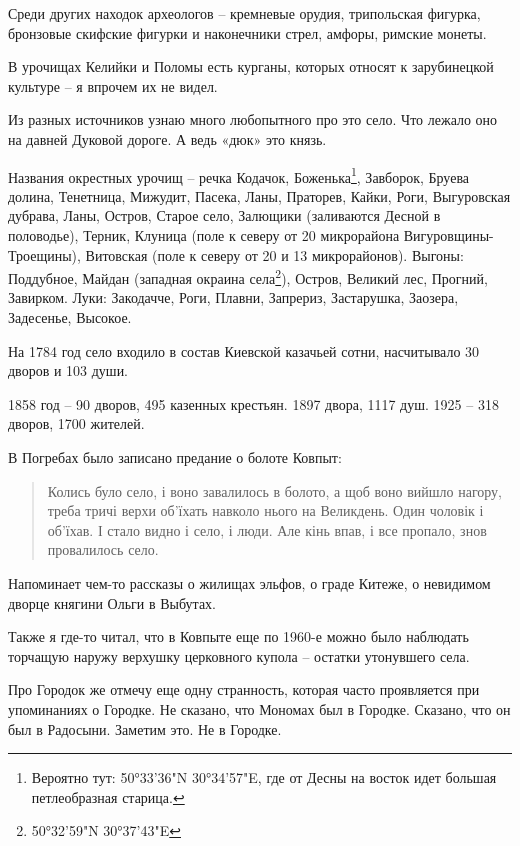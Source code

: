 Среди других находок археологов – кремневые орудия, трипольская фигурка, бронзовые скифские фигурки и наконечники стрел, амфоры, римские монеты.

В урочищах Келийки и Поломы есть курганы, которых относят к зарубинецкой культуре – я впрочем их не видел.

Из разных источников узнаю много любопытного про это село. Что лежало оно на давней Дуковой дороге. А ведь «дюк» это князь.

Названия окрестных урочищ – речка Кодачок, Боженька\footnote{Вероятно тут: 50°33'36"N  30°34'57"E, где от Десны на восток идет большая петлеобразная старица.}, Завборок, Бруева долина, Тенетница, Мижудит, Пасека, Ланы, Праторев, Кайки, Роги, Выгуровская дубрава, Ланы, Остров, Старое село, Залющики (заливаются Десной в половодье), Терник, Клуница (поле к северу от 20 микрорайона Вигуровщины-Троещины), Витовская (поле к северу от 20 и 13 микрорайонов). Выгоны: Поддубное, Майдан (западная окраина села\footnote{50°32'59"N 30°37'43"E}), Остров, Великий лес, Прогний, Завирком. Луки: Закодачче, Роги, Плавни, Запрериз, Застарушка, Заозера, Задесенье, Высокое.

На 1784 год село входило в состав Киевской казачьей сотни, насчитывало 30 дворов и 103 души.

1858 год – 90 дворов, 495 казенных крестьян. 1897 двора, 1117 душ. 1925 – 318 дворов, 1700 жителей.


В Погребах было записано предание о болоте Ковпыт:

\begin{quotation}
Колись було село, і воно завалилось в болото, а щоб воно вийшло нагору, треба тричі верхи об'їхать навколо нього на Великдень. Один чоловік і об'їхав. І стало видно і село, і люди. Але кінь впав, і все пропало, знов провалилось село.
\end{quotation}

Напоминает чем-то рассказы о жилищах эльфов, о граде Китеже, о невидимом дворце княгини Ольги в Выбутах.

Также я где-то читал, что в Ковпыте еще по 1960-е можно было наблюдать торчащую наружу верхушку церковного купола – остатки утонувшего села.

Про Городок же отмечу еще одну странность, которая часто проявляется при упоминаниях о Городке. Не сказано, что Мономах был в Городке. Сказано, что он был в Радосыни. Заметим это. Не в Городке.

